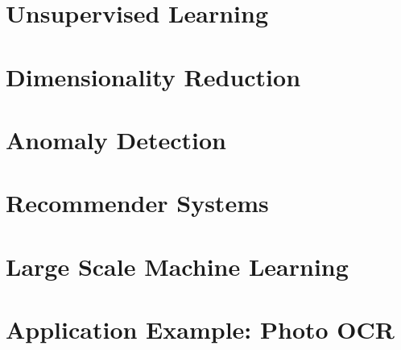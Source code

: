 \documentclass{article}
\begin{document}
    \section{Unsupervised Learning}
    \section{Dimensionality Reduction}
    \section{Anomaly Detection}
    \section{Recommender Systems}
    \section{Large Scale Machine Learning}
    \section{Application Example: Photo OCR}
\end{document}
